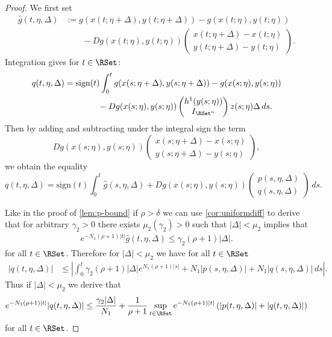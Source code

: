 \documentclass[a4paper]{siamart190516}
\newcommand{\sgn}{\text{sign}}
\begin{document}
\begin{proof}
We first set
  \begin{align*}
  \hat{g}(t,\eta,\Delta) &:= g(x(t;\eta+\Delta), y(t;\eta+\Delta)) - g(x(t;\eta), y(t;\eta)) \\
&\qquad  - D g(x(t;\eta), y(t;\eta)) \begin{pmatrix} x(t;\eta+\Delta) - x(t;\eta) \\ y(t;\eta+\Delta)-y(t;\eta)  \end{pmatrix}.
  \end{align*}
 Integration gives for $t \in \RSet$:
  \begin{align*}
  q(t,\eta,\Delta) &= \sgn(t) \int_0^t g(x(s;\eta+\Delta), y(s;\eta+\Delta)) - g(x(s;\eta), y(s;\eta)) \\
  &\qquad \qquad - D g(x(s;\eta), y(s;\eta)) \begin{pmatrix} h^1(y(s;\eta)) \\ I_{\RSet^n} \end{pmatrix} z(s;\eta) \Delta \, ds.
    \end{align*}
  Then by adding and subtracting under the integral sign the term 
  \[
  D g(x(s;\eta), y(s;\eta)) \begin{pmatrix} x(s;\eta+\Delta) - x(s;\eta) \\ y(s;\eta+\Delta)-y(s;\eta)  \end{pmatrix},
 \]
we obtain the equality
  \[
    q(t,\eta,\Delta) = \sgn(t) \int_0^t \hat{g}(s,\eta,\Delta) +  D g(x(s;\eta), y(s;\eta)) \begin{pmatrix} p(s,\eta,\Delta) \\ q(s,\eta,\Delta) \end{pmatrix}   \, ds.
  \]

  

 Like in the proof of \cref{lem:p-bound} if $\rho > \delta$ we can use \cref{cor:uniformdiff} to derive that for arbitrary $\gamma_2 > 0$ there exists $\mu_2(\gamma_2) > 0$ such that $|\Delta|<\mu_2$ implies that
  \begin{align*}
e^{-N_1 (\rho+1)|t|} \hat{g}(t,\eta,\Delta) \leq \gamma_2 (\rho + 1) |\Delta|.
  \end{align*}
  for all $t \in \RSet$. Therefore for $|\Delta| < \mu_2$ we have for all $t \in \RSet$
  \begin{align*}
  |q(t,\eta,\Delta)| &\leq \left| \int_0^t \gamma_2 (\rho+1)  |\Delta| e^{N_1 (\rho +1) |s|}  + N_1 |p(s,\eta, \Delta)| + N_1 |q(s, \eta,\Delta)| \, ds \right|.
  \end{align*}
  Thus if $|\Delta| < \mu_2$ we derive that 
    \begin{align*}
    e^{ - N_1 (\rho +1)|t|} |q(t,\eta,\Delta)| \leq  \frac{\gamma_2|\Delta|}{N_1} + \frac{1}{\rho+1} \sup_{t \in \RSet} e^{-N_1 (\rho +1)|t|}  \left( |p(t,\eta,\Delta)| +  |q(t, \eta, \Delta)| \right)
  \end{align*}
  for all $t \in \RSet$. 
  \end{proof}
  
\end{document}
